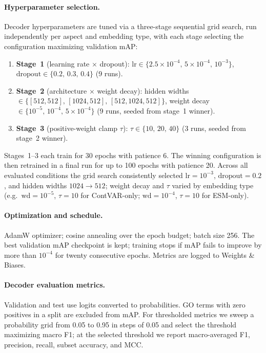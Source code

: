 \documentclass[11pt,a4paper]{article}
\begin{document}
\paragraph{Hyperparameter selection.}
Decoder hyperparameters are tuned via a three-stage sequential grid search, run independently per aspect and embedding type, with each stage selecting the configuration maximizing validation mAP:
\begin{enumerate}
    \item \textbf{Stage~1} (learning rate $\times$ dropout): $\text{lr}\in\{2.5\!\times\!10^{-4},\,5\!\times\!10^{-4},\,10^{-3}\}$, $\text{dropout}\in\{0.2,\,0.3,\,0.4\}$ (9 runs).
    \item \textbf{Stage~2} (architecture $\times$ weight decay): hidden widths $\in\{[512,512],\,[1024,512],\,[512,1024,512]\}$, weight decay $\in\{10^{-5},\,10^{-4},\,5\!\times\!10^{-4}\}$ (9 runs, seeded from stage~1 winner).
    \item \textbf{Stage~3} (positive-weight clamp $\tau$): $\tau\in\{10,\,20,\,40\}$ (3 runs, seeded from stage~2 winner).
\end{enumerate}
Stages~1--3 each train for 30 epochs with patience 6. The winning configuration is then retrained in a final run for up to 100 epochs with patience 20. Across all evaluated conditions the grid search consistently selected $\text{lr}=10^{-3}$, $\text{dropout}=0.2$, and hidden widths $1024\!\to\!512$; weight decay and $\tau$ varied by embedding type (e.g.\ $\text{wd}=10^{-5}$, $\tau=10$ for ContVAR-only; $\text{wd}=10^{-4}$, $\tau=10$ for ESM-only).

\paragraph{Optimization and schedule.}
AdamW optimizer; cosine annealing over the epoch budget; batch size 256. The best validation mAP checkpoint is kept; training stops if mAP fails to improve by more than $10^{-4}$ for twenty consecutive epochs. Metrics are logged to Weights \& Biases.

\paragraph{Decoder evaluation metrics.}
Validation and test use logits converted to probabilities. GO terms with zero positives in a split are excluded from mAP. For thresholded metrics we sweep a probability grid from 0.05 to 0.95 in steps of 0.05 and select the threshold maximizing macro F1; at the selected threshold we report macro-averaged F1, precision, recall, subset accuracy, and MCC.
\end{document}
